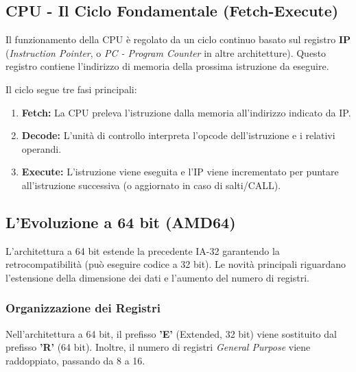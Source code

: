 \documentclass[a4paper,12pt]{article}
\begin{document}
	\subsection{CPU - Il Ciclo Fondamentale (Fetch-Execute)}
	Il funzionamento della CPU è regolato da un ciclo continuo basato sul registro \textbf{IP} (\textit{Instruction Pointer}, o \textit{PC - Program Counter} in altre architetture). Questo registro contiene l'indirizzo di memoria della prossima istruzione da eseguire.
	
	Il ciclo segue tre fasi principali:
	\begin{enumerate}
		\item \textbf{Fetch:} La CPU preleva l'istruzione dalla memoria all'indirizzo indicato da IP.
		\item \textbf{Decode:} L'unità di controllo interpreta l'opcode dell'istruzione e i relativi operandi.
		\item \textbf{Execute:} L'istruzione viene eseguita e l'IP viene incrementato per puntare all'istruzione successiva (o aggiornato in caso di salti/CALL).
	\end{enumerate}
	
	\subsection{L'Evoluzione a 64 bit (AMD64)}
	L'architettura a 64 bit estende la precedente IA-32 garantendo la retrocompatibilità (può eseguire codice a 32 bit). Le novità principali riguardano l'estensione della dimensione dei dati e l'aumento del numero di registri.
	
	\subsubsection{Organizzazione dei Registri}
	Nell'architettura a 64 bit, il prefisso \textbf{'E'} (Extended, 32 bit) viene sostituito dal prefisso \textbf{'R'} (64 bit). Inoltre, il numero di registri \textit{General Purpose} viene raddoppiato, passando da 8 a 16.
	
\end{document}
